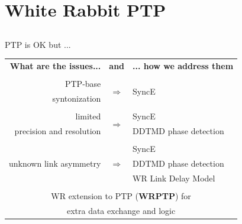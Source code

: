 \documentclass[compress,red]{beamer}
\begin{document}
\section{White Rabbit PTP}
\subsection{}
\begin{frame}{PTP is OK but ...}

  \resizebox{11cm}{!} 
  {
    \begin{tabular}{ r c l }
  {\bf What are the issues...} 	& {\bf and}      & {\bf ... how we address them}  \\
				&     		 &        \\
      PTP-base		 	& \multirow{2}{*}{$\Rightarrow$}  & \multirow{2}{*}{SyncE }\\
      syntonization	        &      		 &        \\
				&      		 &        			\\
      limited             	&\multirow{2}{*}{$\Rightarrow$}  	 & SyncE \\
      precision and resolution  &      		 & DDTMD phase detection\\
				&    		 &        \\
			        &      		 & SyncE  \\
      unknown link asymmetry    & $\Rightarrow$  & DDTMD phase detection \\
				&      		 & WR Link Delay Model \\
				&      		 &        \\
      \multicolumn{3}{c}{WR extension to PTP ({\bf WRPTP}) for } \\
      \multicolumn{3}{c}{extra data exchange and logic} \\
    \end{tabular}
  }
\end{frame}
\end{document}
